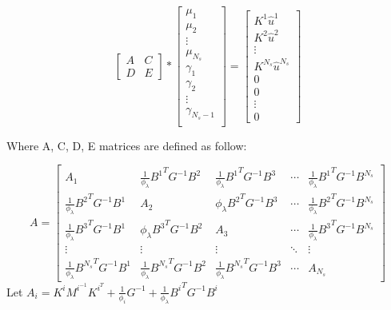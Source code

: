 \documentclass{article}
\begin{document}
\begin{equation}
    \begin{bmatrix}
   A & C \\
   D & E
\end{bmatrix} 
*
\begin{bmatrix}
\mu_1 \\
\mu_2 \\
\vdots \\
\mu_{N_s}\\
\gamma_1 \\
\gamma_2 \\
\vdots \\
\gamma_{N_s-1} \\
\end{bmatrix} = \begin{bmatrix}
K^1 \hat{u}^1\\
K^2 \hat{u}^2 \\
\vdots \\
K^{N_s} \hat{u}^{N_s} \\
0 \\
0 \\
\vdots \\
0
\end{bmatrix}
\end{equation}

Where A, C, D, E matrices are defined as follow:

\begin{equation}
A = 
\begin{bmatrix}
A_1 & \frac{1}{\phi_\lambda} {B^1}^T G^{-1} B^2 & \frac{1}{\phi_\lambda} {B^1}^T G^{-1} B^3 & \cdots & \frac{1}{\phi_\lambda} {B^1}^T G^{-1} B^{N_s} \\
\frac{1}{\phi_\lambda} {B^2}^T G^{-1} B^1 & A_2 & {\phi_\lambda} {B^2}^T G^{-1} B^{3} & \cdots & \frac{1}{\phi_\lambda} {B^2}^T G^{-1} B^{N_s} \\
\frac{1}{\phi_\lambda} {B^3}^T G^{-1} B^1  & {\phi_\lambda} {B^3}^T G^{-1} B^{2} & A_3 & \cdots & \frac{1}{\phi_\lambda} {B^3}^T G^{-1} B^{N_s} \\
\vdots & \vdots & \vdots & \ddots & \vdots \\
\frac{1}{\phi_\lambda} {B^{N_s}}^T G^{-1} B^1 & \frac{1}{\phi_\lambda} {B^{N_s}}^T G^{-1} B^2 & \frac{1}{\phi_\lambda} {B^{N_s}}^T G^{-1} B^3 & \cdots & A_{N_s} 
\end{bmatrix}
\end{equation}
 Let $A_i = K^i M^{i^{-1}} K^{i^{T}} + \frac{1}{\phi_i} G^{-1} + \frac{1}{\phi_\lambda} {B^i}^T G^{-1} B^i $
\end{document}
